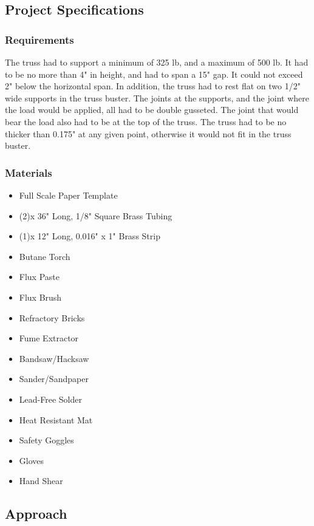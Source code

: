\documentclass{article}
\let\Oldsubsection\subsection
\renewcommand{\subsection}{\FloatBarrier\Oldsubsection}
\let\Oldsubsubsection\subsubsection
\renewcommand{\subsubsection}{\FloatBarrier\Oldsubsubsection}
\begin{document}
\subsection{Project Specifications}

\subsubsection{Requirements}

The truss had to support a minimum of 325 lb, and a maximum of 500 lb. It had to be no more than 4" in height, and had to span a 15" gap. It could not exceed 2" below the horizontal span. In addition, the truss had to rest flat on two 1/2" wide supports in the truss buster. The joints at the supports, and the joint where the load would be applied, all had to be double gusseted. The joint that would bear the load also had to be at the top of the truss. The truss had to be no thicker than 0.175" at any given point, otherwise it would not fit in the truss buster. 

\subsubsection{Materials}
\begin{itemize}
\item Full Scale Paper Template
\item (2)x 36" Long, 1/8" Square Brass Tubing
\item (1)x 12" Long, 0.016" x 1" Brass Strip
\item Butane Torch
\item Flux Paste
\item Flux Brush
\item Refractory Bricks
\item Fume Extractor
\item Bandsaw/Hacksaw
\item Sander/Sandpaper
\item Lead-Free Solder
\item Heat Resistant Mat
\item Safety Goggles
\item Gloves
\item Hand Shear
\end{itemize}

\subsection{Approach}
\end{document}
